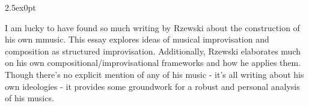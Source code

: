 \documentclass[14pt, letterpaper]{article}
\begin{document}
\clearpage


\begin{adjustwidth}{2.5ex}{0pt}

  I am lucky to have found so much writing by Rzewski about the construction of his own mmusic. This essay explores ideas of musical improvisation and composition as structured improvisation. Additionally, Rzewski elaborates much on his own compositional/improvisational frameworks and how he applies them. Though there's no explicit mention of any of his music - it's all writing about his own ideologies - it provides some groundwork for a robust and personal analysis of his musics.

\end{adjustwidth}

\clearpage

\nocite{*}

\printbibliography
\end{document}
